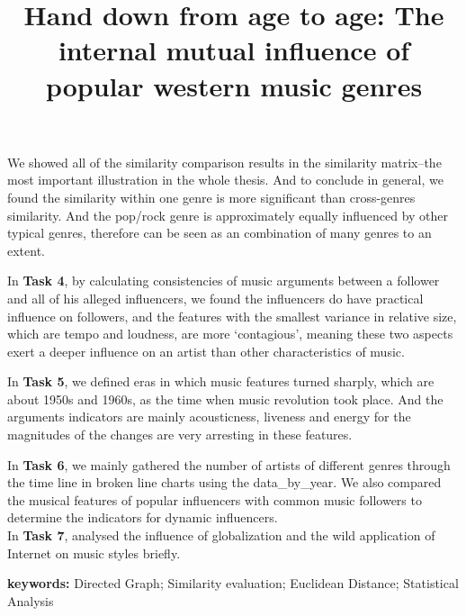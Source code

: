 \documentclass[12pt]{article}
\begin{document}
\begin{flushleft}
\quad We showed all of the similarity comparison results in the similarity matrix--the most important illustration in the whole thesis.
And to conclude in general, we found the similarity within one genre is more significant than cross-genres similarity.
And the pop/rock genre is approximately equally influenced by other typical genres, therefore can be seen as an combination of many genres to an extent.

\quad In \textbf{Task 4}, by calculating consistencies of music arguments between a follower and all of his alleged influencers, we found the influencers do have practical influence on followers, and the features with the smallest variance in relative size, which are tempo and loudness, are more ‘contagious’, meaning these two aspects exert a deeper influence on an artist than other characteristics of music. 

\quad In \textbf{Task 5}, we defined eras in which music features turned sharply, which are about 1950s and 1960s, as the time when music revolution took place. And the arguments indicators are mainly acousticness, liveness and energy for the magnitudes of the changes are very arresting in these features. 

\quad In \textbf{Task 6}, we mainly gathered the number of artists of different genres through the time line in broken line charts using the data\_by\_year. We also compared the musical features of popular influencers with common music followers to determine the indicators for dynamic influencers. \\
\quad In \textbf{Task 7}, analysed the influence of globalization and the wild application of Internet on music styles briefly.

 \end{flushleft}

\begin{flushleft}
\textbf{keywords:}
Directed Graph; Similarity evaluation; Euclidean Distance; Statistical Analysis
\end{flushleft}


\clearpage
\pagestyle{fancy}
\newpage
\setcounter{page}{1}
\title{Hand down from age to age: The internal mutual influence of popular western music genres}
\maketitle
\tableofcontents
\end{document}

